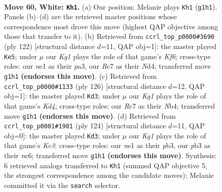 \documentclass[11pt]{article}
\begin{document}
\clearpage

\begin{figure}[p]\centering
\begin{subfigure}{0.46\textwidth}\centering
\resizebox{\linewidth}{!}{%
\newchessgame
\chessboard[
  setfen={1N6/2R5/3p1k2/8/6pp/1p6/8/4n1K1 w - - 1 60},
  showmover=false,
  pgfstyle=straightmove, color=movearrow, markmove={g1-h1}
]}
\caption{}
\end{subfigure}\hfill
\begin{subfigure}{0.46\textwidth}\centering
\resizebox{\linewidth}{!}{%
\newchessgame
\chessboard[
  setfen={8/1pp5/5K2/8/2PN2k1/p7/8/8 w - - 2 62},
  showmover=false,
  pgfstyle=straightmove, color=movearrow, markmove={f6-e5}
]}
\caption{}
\end{subfigure}
\\[4pt]
\begin{subfigure}{0.46\textwidth}\centering
\resizebox{\linewidth}{!}{%
\newchessgame
\chessboard[
  setfen={8/1k5p/8/8/PN1K2p1/6P1/8/1n6 w - - 0 64},
  showmover=false,
  pgfstyle=straightmove, color=movearrow, markmove={d4-d3}
]}
\caption{}
\end{subfigure}\hfill
\begin{subfigure}{0.46\textwidth}\centering
\resizebox{\linewidth}{!}{%
\newchessgame
\chessboard[
  setfen={8/8/2n5/2P5/7k/pp2K3/8/6R1 w - - 0 63},
  showmover=false,
  pgfstyle=straightmove, color=movearrow, markmove={e3-d3}
]}
\caption{}
\end{subfigure}
\caption{\textbf{Move 60, White: \texttt{Kh1}.} (a) Our position; Melanie plays \texttt{Kh1} (\texttt{g1h1}). Panels (b)--(d) are the retrieved master positions whose correspondence most drove this move (highest QAP objective among those that transfer to it). (b) Retrieved from \texttt{ccrl\_top\_p0000\#3690} (ply 122) [structural distance $d$=11, QAP obj=1]: the master played \texttt{Ke5}; under $\mu$ our \emph{Kg1} plays the role of that game's \emph{Kf6}; cross-type roles: our \emph{n}e1 as their \emph{p}a3, our \emph{R}c7 as their \emph{N}d4; transferred move \texttt{g1h1} \textbf{(endorses this move)}. (c) Retrieved from \texttt{ccrl\_top\_p0000\#1133} (ply 126) [structural distance $d$=12, QAP obj=1]: the master played \texttt{Kd3}; under $\mu$ our \emph{Kg1} plays the role of that game's \emph{Kd4}; cross-type roles: our \emph{R}c7 as their \emph{N}b4; transferred move \texttt{g1h1} \textbf{(endorses this move)}. (d) Retrieved from \texttt{ccrl\_top\_p0001\#1901} (ply 124) [structural distance $d$=11, QAP obj=0]: the master played \texttt{Kd3}; under $\mu$ our \emph{Kg1} plays the role of that game's \emph{Ke3}; cross-type roles: our \emph{n}e1 as their \emph{p}b3, our \emph{p}b3 as their \emph{n}c6; transferred move \texttt{g1h1} \textbf{(endorses this move)}. Synthesis: 6 retrieved analogs transferred to \texttt{Kh1} (summed QAP objective 5, the strongest correspondence among the candidate moves); Melanie committed it via the \texttt{search} selector.}
\label{fig:thought-m118}
\end{figure}
\end{document}
